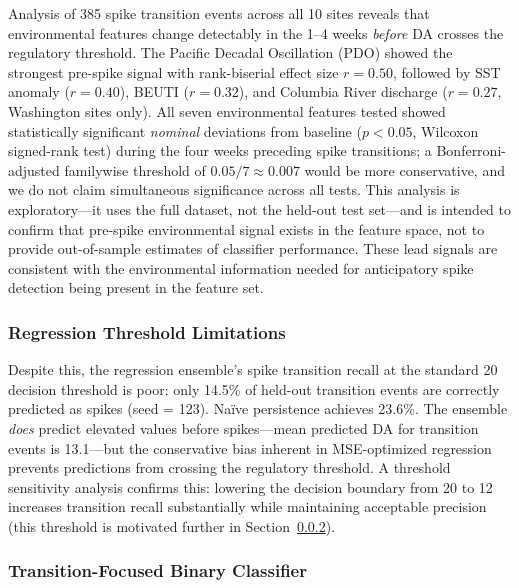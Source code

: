 \documentclass[toxins,article,submit,moreauthors]{Definitions/mdpi}
\begin{document}
Analysis of 385 spike transition events across all 10 sites reveals that environmental features change detectably in the 1--4 weeks \emph{before} DA crosses the regulatory threshold. The Pacific Decadal Oscillation (PDO) showed the strongest pre-spike signal with rank-biserial effect size $r = 0.50$, followed by SST anomaly ($r = 0.40$), BEUTI ($r = 0.32$), and Columbia River discharge ($r = 0.27$, Washington sites only). All seven environmental features tested showed statistically significant \emph{nominal} deviations from baseline ($p < 0.05$, Wilcoxon signed-rank test) during the four weeks preceding spike transitions; a Bonferroni-adjusted familywise threshold of $0.05/7 \approx 0.007$ would be more conservative, and we do not claim simultaneous significance across all tests. This analysis is exploratory---it uses the full dataset, not the held-out test set---and is intended to confirm that pre-spike environmental signal exists in the feature space, not to provide out-of-sample estimates of classifier performance. These lead signals are consistent with the environmental information needed for anticipatory spike detection being present in the feature set.

\subsubsection{Regression Threshold Limitations}
\label{sec:results-threshold-limit}

Despite this, the regression ensemble's spike transition recall at the standard \SI{20}{\microgrampeg} decision threshold is poor: only 14.5\% of held-out transition events are correctly predicted as spikes (seed = 123). Na\"ive persistence achieves 23.6\%. The ensemble \emph{does} predict elevated values before spikes---mean predicted DA for transition events is \SI{13.1}{\microgrampeg}---but the conservative bias inherent in MSE-optimized regression prevents predictions from crossing the regulatory threshold. A threshold sensitivity analysis confirms this: lowering the decision boundary from 20 to \SI{12}{\microgrampeg} increases transition recall substantially while maintaining acceptable precision (this threshold is motivated further in Section~\ref{sec:results-spike-classifier}).

\subsubsection{Transition-Focused Binary Classifier}
\label{sec:results-spike-classifier}
\end{document}
